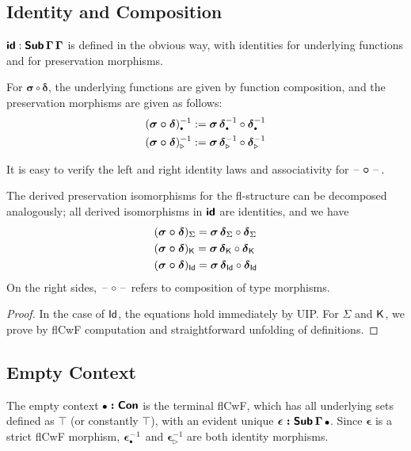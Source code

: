 \documentclass[sigplan,review,anonymous]{acmart}\settopmatter{printfolios=true,printccs=false,printacmref=false}
\newcommand{\ext}{\triangleright}
\newcommand{\emptycon}{\scaleobj{.75}\bullet}
\newcommand{\bSub}{\boldsymbol{\Sub}}
\newcommand{\bGamma}{\boldsymbol{\Gamma}}
\newcommand{\bsigma}{\boldsymbol{\sigma}}
\newcommand{\bdelta}{\boldsymbol{\delta}}
\newcommand{\bepsilon}{\boldsymbol{\epsilon}}
\newcommand{\bid}{\boldsymbol{\id}}
\begin{document}
\subsection{Identity and Composition}
\label{sec:idcomp}

$\bid : \bSub\,\bGamma\,\bGamma$ is defined in the obvious way, with identities for
underlying functions and for preservation morphisms.

For $\boldsymbol{\sigma \circ \delta}$, the underlying functions are given by
function composition, and the preservation morphisms are given as follows:
\begin{alignat*}{3}
  & (\boldsymbol{\sigma \circ \delta})_{\emptycon}^{-1} :=
    \bsigma\,\bdelta_{\emptycon}^{-1} \circ \bdelta_{\emptycon}^{-1} \\
  & (\boldsymbol{\sigma \circ \delta})_{\ext}^{-1} :=
    \bsigma\,\bdelta_{\ext}^{-1} \circ \bdelta_{\ext}^{-1}
\end{alignat*}

It is easy to verify the left and right identity laws and associativity for $\boldsymbol{\mathord{\hspace{1pt}\text{--}\hspace{1pt}}\circ\mathord{\hspace{1pt}\text{--}\hspace{1pt}}}$.

\begin{lemma}\label{lem:idcomppres} The derived preservation isomorphisms for the fl-structure can be decomposed analogously; all derived isomorphisms in $\bid$ are identities, and we have
\begin{alignat*}{3}
  & (\boldsymbol{\sigma \circ \delta})_{\Sigma} =
  \bsigma\,\bdelta_{\Sigma} \circ \bdelta_{\Sigma}\\
  & (\boldsymbol{\sigma \circ \delta})_{\K} =
  \bsigma\,\bdelta_{\K} \circ \bdelta_{\K}\\
  & (\boldsymbol{\sigma \circ \delta})_{\Id} =
  \bsigma\,\bdelta_{\Id} \circ \bdelta_{\Id}
\end{alignat*}
On the right sides, $\mathord{\hspace{1pt}\text{--}\hspace{1pt}}\circ\mathord{\hspace{1pt}\text{--}\hspace{1pt}}$ refers to composition of type morphisms.
\end{lemma}
\begin{proof} In the case of $\mathsf{Id}$, the equations hold immediately by UIP. For $\Sigma$ and $\mathsf{K}$, we prove by flCwF computation and straightforward unfolding of definitions.
\end{proof}

\subsection{Empty Context}
The empty context $\boldsymbol{\emptycon : \Con}$ is the terminal flCwF, which
has all underlying sets defined as $\top$ (or constantly $\top$), with an
evident unique $\boldsymbol{\epsilon : \Sub\,\Gamma\,\emptycon}$. Since
$\bepsilon$ is a strict flCwF morphism, $\bepsilon_{\emptycon}^{-1}$ and
$\bepsilon_{\ext}^{-1}$ are both identity morphisms.
\end{document}
